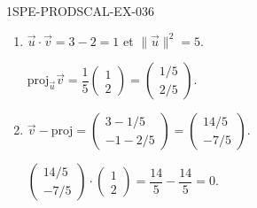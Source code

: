 \begin{corrige}{1SPE-PRODSCAL-EX-036}
\begin{enumerate}
\item $\vec{u} \cdot \vec{v} = 3 - 2 = 1$ et $\|\vec{u}\|^2 = 5$.

$\text{proj}_{\vec{u}}\vec{v} = \dfrac{1}{5}\begin{pmatrix} 1 \\ 2 \end{pmatrix} = \begin{pmatrix} 1/5 \\ 2/5 \end{pmatrix}$.

\item $\vec{v} - \text{proj} = \begin{pmatrix} 3-1/5 \\ -1-2/5 \end{pmatrix} = \begin{pmatrix} 14/5 \\ -7/5 \end{pmatrix}$.

$\begin{pmatrix} 14/5 \\ -7/5 \end{pmatrix} \cdot \begin{pmatrix} 1 \\ 2 \end{pmatrix} = \dfrac{14}{5} - \dfrac{14}{5} = 0$. \checkmark
\end{enumerate}
\end{corrige}
